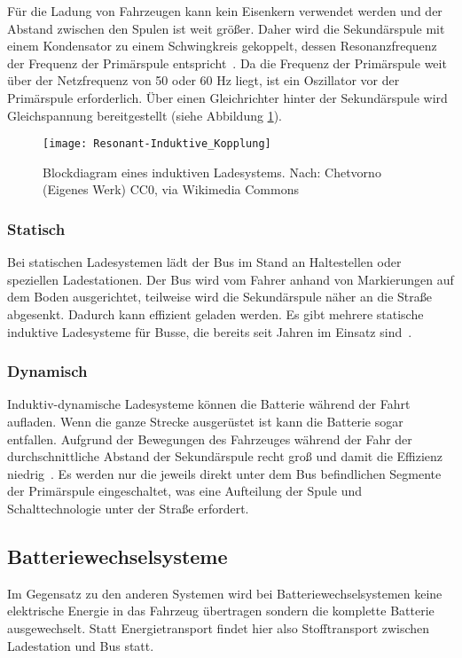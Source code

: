 Für die Ladung von Fahrzeugen kann kein Eisenkern verwendet werden und der Abstand zwischen den Spulen ist weit größer. Daher wird die Sekundärspule mit einem Kondensator zu einem Schwingkreis gekoppelt, dessen Resonanzfrequenz der Frequenz der Primärspule entspricht~\cite{Kurs06072007}. Da die Frequenz der Primärspule weit über der Netzfrequenz von 50 oder 60 Hz liegt, ist ein Oszillator vor der Primärspule erforderlich. Über einen Gleichrichter hinter der Sekundärspule wird Gleichspannung bereitgestellt (siehe Abbildung \ref{abb_ResIndKopplung}).

\begin{figure}\centering
	\texttt{[image: Resonant-Induktive\_Kopplung]}
	\caption{Blockdiagram eines induktiven Ladesystems. Nach: Chetvorno (Eigenes Werk) CC0, via Wikimedia Commons}
	\label{abb_ResIndKopplung}
\end{figure}

\subsubsection{Statisch}
Bei statischen Ladesystemen lädt der Bus im Stand an Haltestellen oder speziellen Ladestationen. Der Bus wird vom Fahrer anhand von Markierungen auf dem Boden ausgerichtet, teilweise wird die Sekundärspule näher an die Straße abgesenkt. Dadurch kann effizient geladen werden. Es gibt mehrere statische induktive Ladesysteme für Busse, die bereits seit Jahren im Einsatz sind~\cite{WeIPT}.

\subsubsection{Dynamisch}
Induktiv-dynamische Ladesysteme können die Batterie während der Fahrt aufladen. Wenn die ganze Strecke ausgerüstet ist kann die Batterie sogar entfallen. Aufgrund der Bewegungen des Fahrzeuges während der Fahr der durchschnittliche Abstand der Sekundärspule recht groß und damit die Effizienz niedrig~\cite{5618092}. Es werden nur die jeweils direkt unter dem Bus befindlichen Segmente der Primärspule eingeschaltet, was eine Aufteilung der Spule und Schalttechnologie unter der Straße erfordert.

\subsection{Batteriewechselsysteme}
Im Gegensatz zu den anderen Systemen wird bei Batteriewechselsystemen keine elektrische Energie in das Fahrzeug übertragen sondern die komplette Batterie ausgewechselt. Statt Energietransport findet hier also Stofftransport zwischen Ladestation und Bus statt. 

